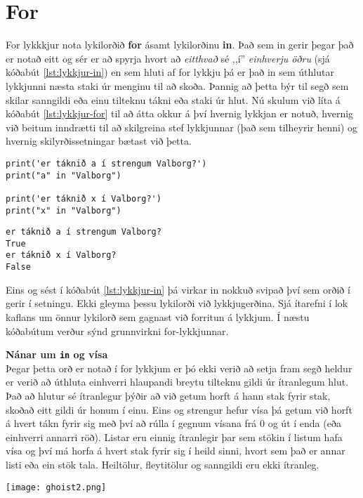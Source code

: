 \section{For}
For lykkkjur nota lykilorðið \textbf{for} ásamt lykilorðinu \textbf{in}.
Það sem in gerir þegar það er notað eitt og sér er að spyrja hvort að \textit{eitthvað} sé ,,í'' \textit{einhverju öðru} (sjá kóðabút \ref{lst:lykkjur-in}) en sem hluti af for lykkju þá er það in sem úthlutar lykkjunni næsta staki úr menginu til að skoða.
Þannig að þetta býr til segð sem skilar sanngildi eða einu tilteknu tákni eða staki úr hlut.
Nú skulum við líta á kóðabút \ref{lst:lykkjur-for} til að átta okkur á því hvernig lykkjan er notuð, hvernig við beitum inndrætti til að skilgreina stef lykkjunnar (það sem tilheyrir henni) og hvernig skilyrðissetningar bætast við þetta.

\begin{lstlisting}[caption=Lykilorðið in, label=lst:lykkjur-in]
print('er táknið a í strengum Valborg?')
print("a" in "Valborg")

print('er táknið x í Valborg?')
print("x" in "Valborg")
\end{lstlisting}
\lstset{style=uttak}
\begin{lstlisting}
er táknið a í strengum Valborg?
True
er táknið x í Valborg?
False
\end{lstlisting}
\lstset{style=venjulegt}

Eins og sést í kóðabút \ref{lst:lykkjur-in} þá virkar in nokkuð svipað því sem orðið í gerir í setningu.
Ekki gleyma þessu lykilorði við lykkjugerðina.
Sjá ítarefni í lok kaflans um önnur lykilorð sem gagnast við forritun á lykkjum.
Í næstu kóðabútum verður sýnd grunnvirkni for-lykkjunnar.

\begin{itarefni}
	\textbf{Nánar um \texttt{in} og vísa}\\
	Þegar þetta orð er notað í for lykkjum er þó ekki verið að setja fram segð heldur er verið að úthluta einhverri hlaupandi breytu tilteknu gildi úr ítranlegum hlut.
	Það að hlutur sé ítranlegur þýðir að við getum horft á hann stak fyrir stak, skoðað eitt gildi úr honum í einu.
	Eins og strengur hefur vísa þá getum við horft á hvert tákn fyrir sig með því að rúlla í gegnum vísana frá 0 og út í enda (eða einhverri annarri röð).
	Listar eru einnig ítranlegir þar sem stökin í listum hafa vísa og því má horfa á hvert stak fyrir sig í heild sinni, hvort sem það er annar listi eða ein stök tala.
	Heiltölur, fleytitölur og sanngildi eru ekki ítranleg.
\end{itarefni}
\vspace{4cm}
	\begin{center}
		\texttt{[image: ghoist2.png]}
	\end{center}

